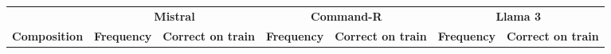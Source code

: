 \begin{table*}
    \scriptsize
    \centering
    \setlength{\tabcolsep}{1.8pt}


    \begin{tabular}{lrrrrrr}
        \toprule
        & \multicolumn{2}{c}{\textbf{Mistral}} & \multicolumn{2}{c}{\textbf{Command-R}} & \multicolumn{2}{c}{\textbf{Llama 3}} \\
        \cmidrule(l){2-3} \cmidrule(l){4-5} \cmidrule(l){6-7}
        \textbf{Composition} & \multicolumn{1}{c}{\textbf{Frequency}} & \multicolumn{1}{c}{\textbf{Correct on train}} & \multicolumn{1}{c}{\textbf{Frequency}} & \multicolumn{1}{c}{\textbf{Correct on train}} & \multicolumn{1}{c}{\textbf{Frequency}} & \multicolumn{1}{c}{\textbf{Correct on train}} \\
        \midrule


\end{tabular}
\end{table*}
